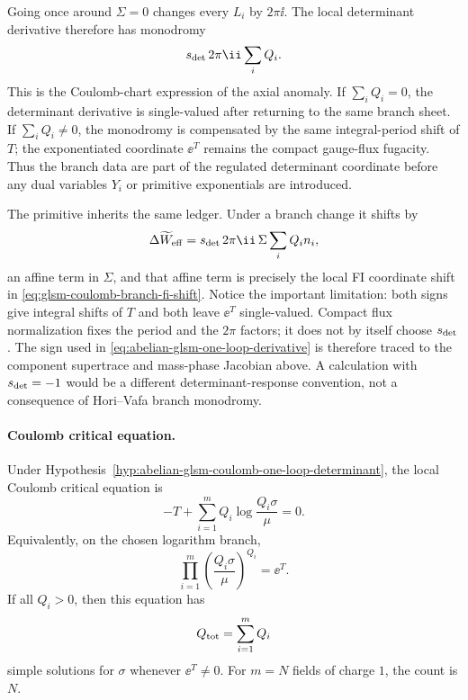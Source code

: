 \begin{remark}
Going once around \(\Sigma=0\) changes every \(L_i\) by \(2\pi\ii\).  The
local determinant derivative therefore has monodromy
\[
  s_{\rm det}\,2\pi\ii\sum_iQ_i .
\]
This is the Coulomb-chart expression of the axial anomaly.  If
\(\sum_iQ_i=0\), the determinant derivative is single-valued after returning
to the same branch sheet.  If \(\sum_iQ_i\neq0\), the monodromy is compensated
by the same integral-period shift of \(T\); the exponentiated coordinate
\(\ee^T\) remains the compact gauge-flux fugacity.  Thus the branch data are
part of the regulated determinant coordinate before any dual variables
\(Y_i\) or primitive exponentials are introduced.

The primitive inherits the same ledger.  Under a branch change it shifts by
\[
  \Delta\widetilde W_{\rm eff}
  =
  s_{\rm det}\,2\pi\ii\,\Sigma\sum_iQ_in_i,
\]
an affine term in \(\Sigma\), and that affine term is precisely the local FI
coordinate shift in \eqref{eq:glsm-coulomb-branch-fi-shift}.  Notice the
important limitation: both signs give integral shifts of \(T\) and both leave
\(\ee^T\) single-valued.  Compact flux normalization fixes the period and the
\(2\pi\) factors; it does not by itself choose \(s_{\rm det}\).  The sign used
in \eqref{eq:abelian-glsm-one-loop-derivative} is therefore traced to the
component supertrace and mass-phase Jacobian above.  A calculation with
\(s_{\rm det}=-1\) would be a different determinant-response convention, not a
consequence of Hori--Vafa branch monodromy.
\end{remark}

\paragraph{Coulomb critical equation.}
Under Hypothesis~\ref{hyp:abelian-glsm-coulomb-one-loop-determinant}, the
local Coulomb critical equation is
\begin{equation}
  -T+\sum_{i=1}^m Q_i\log\frac{Q_i\sigma}{\mu}=0 .
  \label{eq:abelian-glsm-coulomb-log-critical-equation}
\end{equation}
Equivalently, on the chosen logarithm branch,
\begin{equation}
  \prod_{i=1}^m
  \left(\frac{Q_i\sigma}{\mu}\right)^{Q_i}
  =
  \ee^T .
  \label{eq:abelian-glsm-coulomb-exponential-critical-equation}
\end{equation}
If all \(Q_i>0\), then this equation has
\begin{equation}
  Q_{\rm tot}=\sum_{i=1}^m Q_i
  \label{eq:abelian-glsm-positive-charge-vacuum-count}
\end{equation}
simple solutions for \(\sigma\) whenever \(\ee^T\neq0\).  For \(m=N\) fields
of charge \(1\), the count is \(N\).

